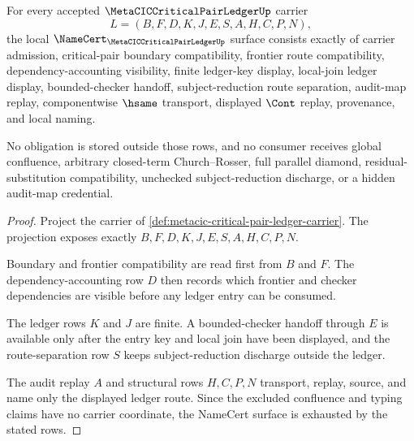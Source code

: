 \begin{theorem}
\label{thm:metacic-critical-pair-ledger-namecert-obligations}
For every accepted $\MetaCICCriticalPairLedgerUp$ carrier
$$
L=(B,F,D,K,J,E,S,A,H,C,P,N),
$$
the local $\NameCert_{\MetaCICCriticalPairLedgerUp}$ surface consists exactly of carrier admission, critical-pair boundary compatibility, frontier route compatibility, dependency-accounting visibility, finite ledger-key display, local-join ledger display, bounded-checker handoff, subject-reduction route separation, audit-map replay, componentwise $\hsame$ transport, displayed $\Cont$ replay, provenance, and local naming.

No obligation is stored outside those rows, and no consumer receives global confluence, arbitrary closed-term Church--Rosser, full parallel diamond, residual-substitution compatibility, unchecked subject-reduction discharge, or a hidden audit-map credential.
\end{theorem}
\begin{proof}
Project the carrier of \autoref{def:metacic-critical-pair-ledger-carrier}. The projection exposes exactly $B,F,D,K,J,E,S,A,H,C,P,N$.

Boundary and frontier compatibility are read first from $B$ and $F$. The dependency-accounting row $D$ then records which frontier and checker dependencies are visible before any ledger entry can be consumed.

The ledger rows $K$ and $J$ are finite. A bounded-checker handoff through $E$ is available only after the entry key and local join have been displayed, and the route-separation row $S$ keeps subject-reduction discharge outside the ledger.

The audit replay $A$ and structural rows $H,C,P,N$ transport, replay, source, and name only the displayed ledger route. Since the excluded confluence and typing claims have no carrier coordinate, the NameCert surface is exhausted by the stated rows.
\end{proof}


